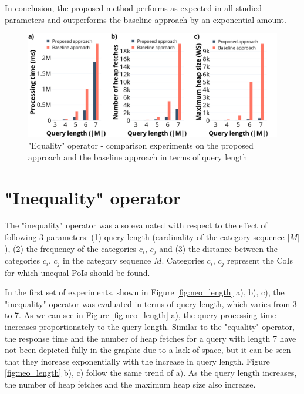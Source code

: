 In conclusion, the proposed method performs as expected in all studied parameters and outperforms the baseline approach by an exponential amount. 

\begin{figure}[H]
	\includegraphics[scale=0.33]{images/eo2_30.png}
	\centering
	\caption{"Equality" operator - comparison experiments on the proposed approach and the baseline approach in terms of query length}
	\label{fig:eo2_length}
\end{figure}


\section{"Inequality" operator}
\label{sec:experimentsNEO}

The "inequality" operator was also evaluated with respect to the effect of following 3 parameters: (1) query length (cardinality of the category sequence $|M|$), (2) the frequency of the categories $c_i$, $c_j$ and (3) the distance between the categories $c_i$, $c_j$ in the category sequence $M$. Categories $c_i$, $c_j$ represent the CoIs for which unequal PoIs should be found.

In the first set of experiments, shown in Figure \ref{fig:neo_length} a), b), c), the "inequality" operator was evaluated in terms of query length, which varies from 3 to 7. As we can see in Figure \ref{fig:neo_length} a), the query processing time increases proportionately to the query length. Similar to the "equality" operator, the response time and the number of heap fetches for a query with length 7 have not been depicted fully in the graphic due to a lack of space, but it can be seen that they increase exponentially with the increase in query length. Figure \ref{fig:neo_length} b), c) follow the same trend of a). As the query length increases, the number of heap fetches and the maximum heap size also increase.


